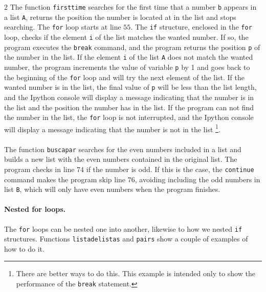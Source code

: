 \begin{paracol}{2}
The function \texttt{firsttime} searches for the first time that a number \texttt{b} appears in a list \texttt{A}, returns the position the number is located at in the list and stops searching. The \texttt{for} loop starts at line $55$. The \texttt{if} structure, enclosed in the \texttt{for} loop, checks if the element \texttt{i} of the list matches the wanted number. If so, the program executes the \texttt{break} command, and the program returns the position \texttt{p} of the number in the list.  If the element \texttt{i} of the list \texttt{A} does not match the wanted number, the program increments the value of variable \texttt{p} by 1 and goes back to the beginning of the \texttt{for} loop and will try the next element of the list. If the wanted number is in the list,  the final value of \texttt{p} will be less than the list length, and the Ipython console will display a message indicating that the number is in the list and the position the number has in the list. If the program can not find the number in the list, the \texttt{for} loop is not interrupted, and the Ipython console will display a message indicating that the number is not in the list \footnote{There are better ways to do this. This example is intended only to show the performance of the \texttt{break} statement.}.
\ \\
\ \\

The function \texttt{buscapar} searches for the even numbers included in a list and builds a new list with the even numbers contained in the original list. The program checks in line $74$ if the number is odd. If this is the case, the \texttt{continue} command makes the program skip line $76$, avoiding including the odd numbers in list \texttt{B}, which will only have even numbers when the program finishes.

\paragraph{Nested for loops.}  The \texttt{for} loops can be nested one into another, likewise to how we nested \texttt{if} structures. Functions \texttt{listadelistas} and \texttt{pairs} show a couple of examples of how to do it.


\end{paracol}
